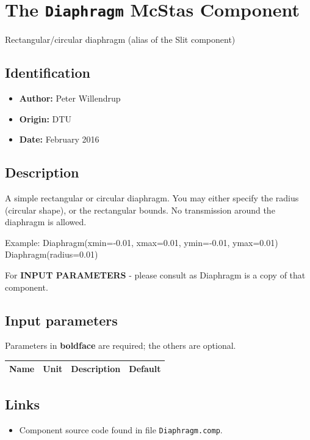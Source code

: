 \section{The \texttt{Diaphragm} McStas Component}
Rectangular/circular diaphragm (alias of the Slit component)

\subsection*{Identification}
\begin{itemize}
  \item \textbf{Author:} Peter Willendrup
  \item \textbf{Origin:} DTU
  \item \textbf{Date:} February 2016
\end{itemize}

\subsection*{Description}
A simple rectangular or circular diaphragm. You may either specify the radius (circular shape), or the rectangular bounds. No transmission around the diaphragm is allowed.

Example: Diaphragm(xmin=-0.01, xmax=0.01, ymin=-0.01, ymax=0.01) Diaphragm(radius=0.01)

For \textbf{INPUT PARAMETERS} - please consult  as Diaphragm is a copy of that component.

\subsection*{Input parameters}
Parameters in \textbf{boldface} are required; the others are optional.

\begin{longtable}{p{}p{}p{}p{}}
\toprule
\textbf{Name} & \textbf{Unit} & \textbf{Description} & \textbf{Default} \\
\midrule
\endhead
\bottomrule
\end{longtable}

\subsection*{Links}
\begin{itemize}
  \item Component source code found in file \texttt{Diaphragm.comp}.
\end{itemize}
